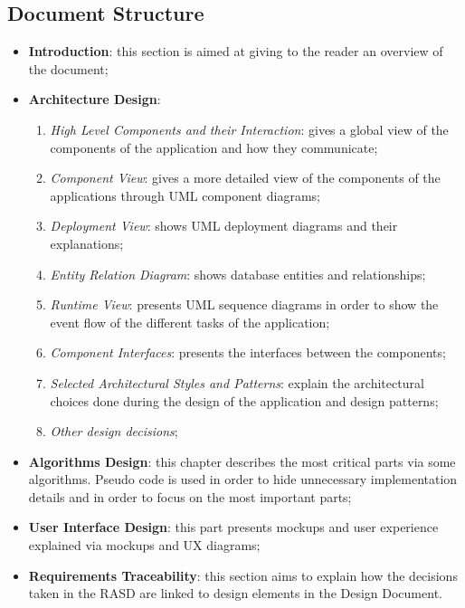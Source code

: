 \documentclass[a4paper]{article}
\begin{document}
\subsection{Document Structure}
\begin{itemize}
    \item \textbf{Introduction}: this section is aimed at giving to the reader an overview of the document;

\item \textbf{Architecture Design}:
\begin{enumerate}
    \item \textit{High Level Components and their Interaction}: gives a global view of the components of the application and how they communicate;

    \item \textit{Component View}: gives a more detailed view of the components of the applications through UML component diagrams;

    \item \textit{Deployment View}: shows UML deployment diagrams and their explanations;
    
    \item \textit{Entity Relation Diagram}: shows database entities and relationships;

    \item \textit{Runtime View}: presents UML sequence diagrams in order to show the event flow of the different tasks of the application;

    \item \textit{Component Interfaces}: presents the interfaces between the components;

    \item \textit{Selected Architectural Styles and Patterns}: explain the architectural choices done during the design of the application and design patterns;

    \item \textit{Other design decisions};
\end{enumerate}

\item \textbf{Algorithms Design}: this chapter describes the most critical parts via some algorithms. Pseudo code is used in order to hide unnecessary implementation details and in order to focus on the most important parts;

\item \textbf{User Interface Design}: this part presents mockups and user experience explained via mockups and UX diagrams;

\item \textbf{Requirements Traceability}: this section aims to explain how the decisions taken in the RASD are linked to design elements in the Design Document.
\end{itemize}
\end{document}
